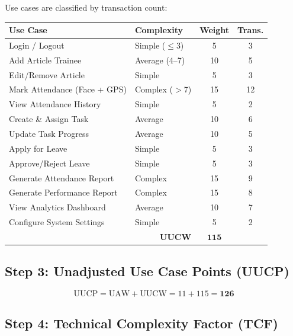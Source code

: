 \documentclass[12pt,a4paper]{article}
\begin{document}
Use cases are classified by transaction count:
\begin{center}
\begin{tabular}{llcc}
\toprule
\textbf{Use Case} & \textbf{Complexity} & \textbf{Weight} & \textbf{Trans.} \\
\midrule
Login / Logout & Simple ($\leq$3) & 5 & 3 \\
Add Article Trainee & Average (4--7) & 10 & 5 \\
Edit/Remove Article & Simple & 5 & 3 \\
Mark Attendance (Face + GPS) & Complex ($>$7) & 15 & 12 \\
View Attendance History & Simple & 5 & 2 \\
Create \& Assign Task & Average & 10 & 6 \\
Update Task Progress & Average & 10 & 5 \\
Apply for Leave & Simple & 5 & 3 \\
Approve/Reject Leave & Simple & 5 & 3 \\
Generate Attendance Report & Complex & 15 & 9 \\
Generate Performance Report & Complex & 15 & 8 \\
View Analytics Dashboard & Average & 10 & 7 \\
Configure System Settings & Simple & 5 & 2 \\
\midrule
\multicolumn{2}{r}{\textbf{UUCW}} & $\mathbf{115}$ & \\
\bottomrule
\end{tabular}
\end{center}

\subsection{Step 3: Unadjusted Use Case Points (UUCP)}

\[
\text{UUCP} = \text{UAW} + \text{UUCW} = 11 + 115 = \mathbf{126}
\]

\subsection{Step 4: Technical Complexity Factor (TCF)}
\end{document}
